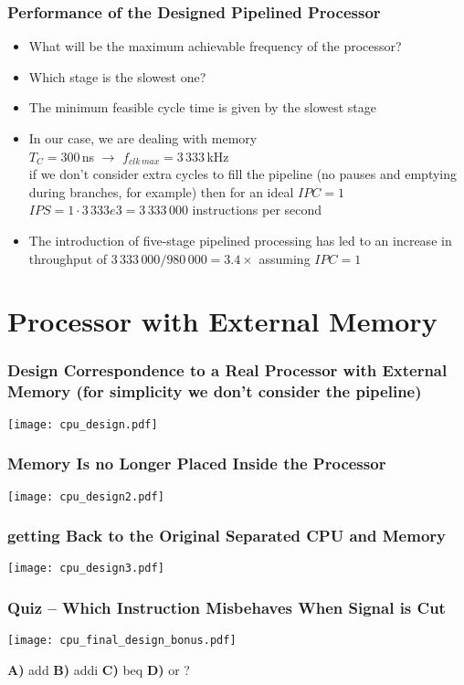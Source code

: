 \documentclass{beamer}
\begin{document}
\begin{frame}
\frametitle{Performance of the Designed Pipelined Processor}

\begin{itemize}
 \item What will be the maximum achievable frequency of the processor?
 \item Which stage is the slowest one?
 \item The minimum feasible cycle time is given by the slowest stage
 \item In our case, we are dealing with memory \\
       $T_C = 300$\,ns $\rightarrow$ $f_{clk\,max} = 3\,333$\,kHz \\
       if we don't consider extra cycles to fill the pipeline (no pauses
       and emptying during branches, for example) then for an ideal $IPC = 1$ \\
       $IPS = 1 \cdot 3\,333e3 = 3\,333\,000$ instructions per second
 \item The introduction of five-stage pipelined processing has led to an increase in
       throughput of $3\,333\,000 / 980\,000 = 3.4 \times$ assuming $IPC = 1$
\end{itemize}

\end{frame}

\section{Processor with External Memory}

\begin{frame}
\frametitle{Design Correspondence to a Real Processor with External Memory (for simplicity we don't consider the pipeline)}
\texttt{[image: cpu\_design.pdf]}
\end{frame}

\begin{frame}
\frametitle{Memory Is no Longer Placed Inside the Processor}
\texttt{[image: cpu\_design2.pdf]}
\end{frame}

\begin{frame}
\frametitle{getting Back to the Original Separated CPU and Memory}
\texttt{[image: cpu\_design3.pdf]}
\end{frame}

\begin{frame}
\frametitle{Quiz -- Which Instruction Misbehaves When Signal is Cut}
\texttt{[image: cpu\_final\_design\_bonus.pdf]}

\textbf{A)} add \hfill \textbf{B)} addi \hfill \textbf{C)} beq \hfill \textbf{D)} or \hfill ?
\end{frame}
\end{document}
